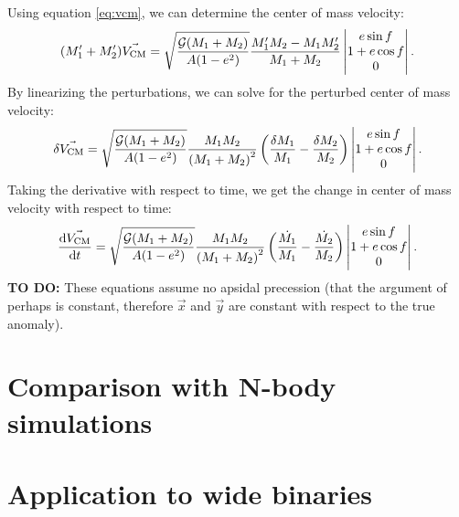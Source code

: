 \documentclass{emulateapj}
\begin{document}
Using equation \ref{eq:vcm}, we can determine the center of mass velocity:
\begin{equation}
(M_1' + M_2') \vec{V_{\rm CM}} = \sqrt{\frac{\mathcal{G} (M_1 + M_2) }{A (1-e^2)}} \frac{M_1' M_2 - M_1 M_2'}{M_1+ M_2}  
  \begin{vmatrix}
     e \sin f \\
    1 + e \cos f \\
    0 \\        
  \end{vmatrix}.
\end{equation}
By linearizing the perturbations, we can solve for the perturbed center of mass velocity:
\begin{equation}
\delta \vec{V_{\rm CM}} = \sqrt{\frac{\mathcal{G} (M_1 + M_2) }{A (1-e^2)}}  \frac{M_1 M_2}{\left( M_1 + M_2 \right)^2} \left( \frac{\delta M_1}{M_1} - \frac{\delta M_2}{M_2} \right)
  \begin{vmatrix}
     e \sin f \\
    1 + e \cos f \\
    0 \\        
  \end{vmatrix}.
\end{equation}
Taking the derivative with respect to time, we get the change in center of mass velocity with respect to time:
\begin{equation}
\frac{{\rm d} \vec{V_{\rm CM}}}{{\rm d}t} = \sqrt{\frac{\mathcal{G} (M_1 + M_2) }{A (1-e^2)}}  \frac{M_1 M_2}{\left( M_1 + M_2 \right)^2} \left( \frac{\dot{M_1}}{M_1} - \frac{\dot{M_2}}{M_2} \right)
  \begin{vmatrix}
     e \sin f \\
    1 + e \cos f \\
    0 \\        
  \end{vmatrix}.
\end{equation}
{\bf TO DO:} These equations assume no apsidal precession (that the argument of perhaps is constant, therefore $\vec{x}$ and $\vec{y}$ are constant with respect to the true anomaly).



\section{Comparison with N-body simulations}



\section{Application to wide binaries}





\acknowledgments


\clearpage
\setlength{\baselineskip}{0.6\baselineskip}

\setlength{\baselineskip}{1.667\baselineskip}
\end{document}
